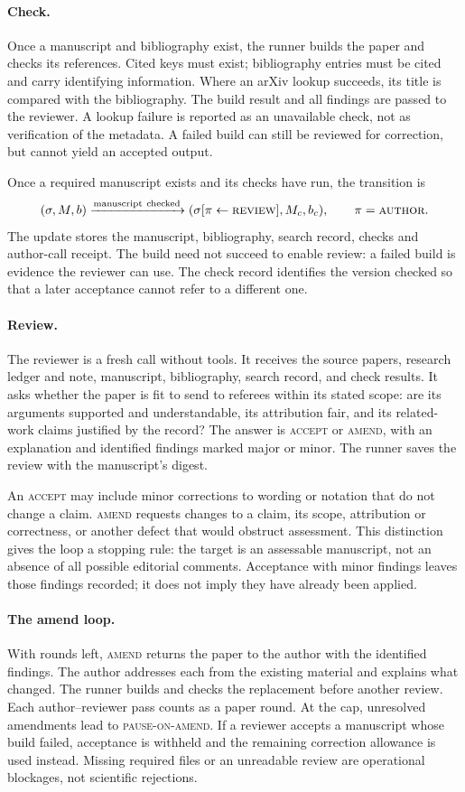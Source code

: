 \documentclass[11pt,a4paper]{article}
\newcommand{\st}[1]{\textsc{#1}}
\begin{document}
\paragraph{Check.}
Once a manuscript and bibliography exist, the runner builds the paper and checks
its references. Cited keys must exist; bibliography entries must be cited and
carry identifying information. Where an arXiv lookup succeeds, its title is
compared with the bibliography. The build result and all findings are passed to
the reviewer. A lookup failure is reported as an unavailable check, not as
verification of the metadata. A failed build can still be reviewed for
correction, but cannot yield an accepted output.

Once a required manuscript exists and its checks have run, the transition is
\[
 (\sigma,M,b)\xrightarrow{\mathrm{manuscript\ checked}}
 (\sigma[\pi\leftarrow\st{review}],M_c,b_c),
 \qquad\pi=\st{author}.
\]
The update stores the manuscript, bibliography, search record, checks and
author-call receipt. The build need not succeed to enable review: a failed build
is evidence the reviewer can use. The check record identifies the version
checked so that a later acceptance cannot refer to a different one.

\paragraph{Review.}
The reviewer is a fresh call without tools. It receives the source papers,
research ledger and note, manuscript, bibliography, search record, and check
results. It asks whether the paper is fit to send to referees within its stated
scope: are its arguments supported and understandable, its attribution fair, and
its related-work claims justified by the record? The answer is \st{accept} or
\st{amend}, with an explanation and identified findings marked major or minor.
The runner saves the review with the manuscript's digest.

An \st{accept} may include minor corrections to wording or notation that do not
change a claim. \st{amend} requests changes to a claim, its scope, attribution
or correctness, or another defect that would obstruct assessment. This
distinction gives the loop a stopping rule: the target is an assessable
manuscript, not an absence of all possible editorial comments. Acceptance with
minor findings leaves those findings recorded; it does not imply they have
already been applied.

\paragraph{The amend loop.}
With rounds left, \st{amend} returns the paper to the author with the identified
findings. The author addresses each from the existing material and explains what
changed. The runner builds and checks the replacement before another review.
Each author--reviewer pass counts as a paper round. At the cap, unresolved
amendments lead to \st{pause-on-amend}. If a reviewer accepts a manuscript whose
build failed, acceptance is withheld and the remaining correction allowance is
used instead. Missing required files or an unreadable review are operational
blockages, not scientific rejections.
\end{document}
